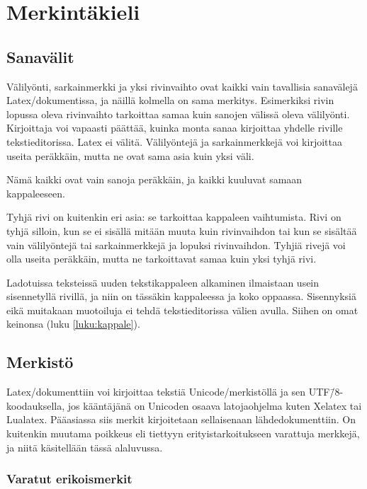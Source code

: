 \chapter{Merkintäkieli}

\section{Sanavälit}

Välilyönti, sarkainmerkki ja yksi rivinvaihto ovat kaikki vain
tavallisia sanavälejä Latex\-/dokumentissa, ja näillä kolmella on sama
merkitys. Esimerkiksi rivin lopussa oleva rivinvaihto tarkoittaa samaa
kuin sanojen välissä oleva välilyönti. Kirjoittaja voi vapaasti päättää,
kuinka monta sanaa kirjoittaa yhdelle riville tekstieditorissa. Latex ei
välitä. Välilyöntejä ja sarkainmerkkejä voi kirjoittaa useita peräkkäin,
mutta ne ovat sama asia kuin yksi väli.

\begin{koodilohkosis}
  Nämä      kaikki
       ovat            vain
  sanoja  peräkkäin,  ja      kaikki                kuuluvat
      samaan kappaleeseen.     
\end{koodilohkosis}

Tyhjä rivi on kuitenkin eri asia: se tarkoittaa kappaleen vaihtumista.
Rivi on tyhjä silloin, kun se ei sisällä mitään muuta kuin rivinvaihdon
tai kun se sisältää vain välilyöntejä tai sarkainmerkkejä ja lopuksi
rivinvaihdon. Tyhjiä rivejä voi olla useita peräkkäin, mutta ne
tarkoittavat samaa kuin yksi tyhjä rivi.

Ladotuissa teksteissä uuden tekstikappaleen alkaminen ilmaistaan usein
sisennetyllä rivillä, ja niin on tässäkin kappaleessa ja koko oppaassa.
Sisennyksiä eikä muitakaan muotoiluja ei tehdä tekstieditorissa välien
avulla. Siihen on omat keinonsa (luku \ref{luku:kappale}).

\section{Merkistö}

Latex\-/dokumenttiin voi kirjoittaa tekstiä Unicode\-/merkistöllä ja sen
UTF\=/8\/-koodauksella, jos kääntäjänä on Unicoden osaava
la\-to\-ja\-oh\-jel\-ma kuten Xelatex tai Lualatex. Pääasiassa siis
merkit kirjoitetaan sellaisenaan lähdedokumenttiin. On kuitenkin muutama
poikkeus eli tiettyyn erityistarkoitukseen varattuja merkkejä, ja niitä
käsitellään tässä alaluvussa.

\subsection{Varatut erikoismerkit}

